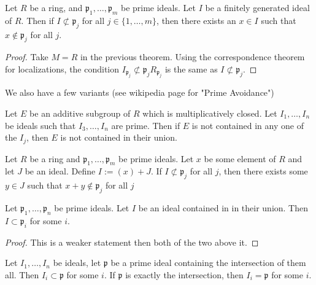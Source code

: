 \begin{corollary}
    \label{cor:prime_avoidance_ring}
    Let \(R\) be a ring, and \(\mathfrak{p}_{1}, \ldots, \mathfrak{p}_{m}\)
    be prime ideals. 
    Let \(I\) be a finitely generated ideal of \(R\).
    Then if \(I \not\subset \mathfrak{p}_{j}\) for all
    \(j \in \{1, \ldots, m\}\),
    then there exists an \(x \in I\)
    such that \(x \not\in \mathfrak{p}_{j}\) for all \(j\).
\end{corollary}

\begin{proof}
    Take \(M = R\) in the previous theorem.
    Using the correspondence theorem for localizations, 
    the condition \(I_{\mathfrak{p}_{j}} \not\subset \mathfrak{p}_{j}R_{\mathfrak{p}_{j}}\)
    is the same as \(I \not\subset \mathfrak{p}_{j}\).
\end{proof}

We also have a few variants (see wikipedia page for "Prime Avoidance")

\begin{lemma}
    Let \(E\) be an additive subgroup of \(R\) which is multiplicatively closed.
    Let \(I_{1}, \ldots, I_{n}\) be ideals such that \(I_{3}, \ldots, I_{n}\) are prime.
    Then if \(E\) is not contained in any one of the \(I_{j}\), then \(E\) is not
    contained in their union.
\end{lemma}

\begin{lemma}
    Let \(R\) be a ring and \(\mathfrak{p}_{1}, \ldots, \mathfrak{p}_{m}\)
    be prime ideals.
    Let \(x\) be some element of \(R\) and let \(J\) be an ideal.
    Define \(I := (x) + J\).
    If \(I \not\subset \mathfrak{p}_{j}\) for all \(j\),
    then
    there exists some \(y \in J\) such that
    \(x + y \not\in \mathfrak{p}_{j}\) for all \(j\)
\end{lemma}
\begin{lemma}
    Let \(\mathfrak{p}_{1}, \ldots, \mathfrak{p}_{n}\) be prime ideals.
    Let \(I\) be an ideal contained in in their union.
    Then \(I \subset \mathfrak{p}_{i}\) for some \(i\).
\end{lemma}

\begin{proof}
    This is a weaker statement then both of the two above it.
\end{proof}

\begin{lemma}
    Let \(I_{1}, \ldots, I_{n}\) be ideals, let \(\mathfrak{p}\) be a
    prime ideal containing the intersection of them all.
    Then \(I_{i} \subset \mathfrak{p}\) for some \(i\).
    If \(\mathfrak{p}\) is exactly the intersection, then
    \(I_{i} = \mathfrak{p}\) for some \(i\).
\end{lemma}

